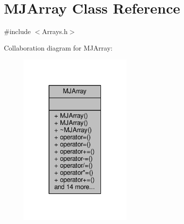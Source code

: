 \hypertarget{classMJArray}{}\section{M\+J\+Array Class Reference}
\label{classMJArray}


{\ttfamily \#include $<$Arrays.\+h$>$}



Collaboration diagram for M\+J\+Array\+:
\nopagebreak
\begin{figure}[H]
\begin{center}
\leavevmode
\includegraphics[width=160pt]{classMJArray__coll__graph}
\end{center}
\end{figure}
